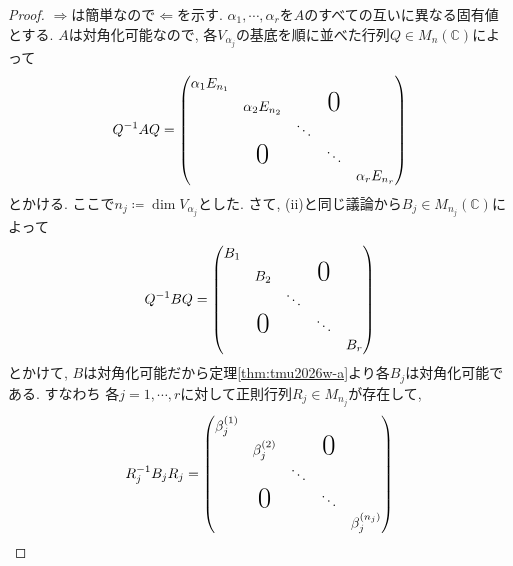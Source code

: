 \documentclass[titlepage]{jsarticle}
\numberwithin{equation}{section}
\newcommand{\C}{\mathbb{C}}%
\begin{document}
\begin{proof}
$\Rightarrow$は簡単なので$\Leftarrow$を示す. $\alpha_1, \cdots, \alpha_r$を$A$のすべての互いに異なる固有値とする. $A$は対角化可能なので, 各$V_{\alpha_j}$の基底を順に並べた行列$Q \in M_n(\C)$によって
\begin{align}
Q^{-1}AQ = 
\begin{pmatrix}
\alpha_1E_{n_1}                                                           \\
         & \alpha_2E_{n_2}           &        & \text{\huge{0}}   \\
         &                      & \ddots                       \\
         & \text{\huge{0}} &        & \ddots             \\
         &                      &        &           & \alpha_rE_{n_r}
\end{pmatrix} \label{r2026-c}
\end{align}
とかける. ここで$n_j \coloneq \dim V_{\alpha_j}$とした. さて, (ii)と同じ議論から$B_j \in M_{n_j}(\C)$によって
\begin{align}
Q^{-1}BQ =
\begin{pmatrix}
B_ 1                                                           \\
         & B_2           &        & \text{\huge{0}}   \\
         &                      & \ddots                       \\
         & \text{\huge{0}} &        & \ddots             \\
         &                      &        &           & B_r
\end{pmatrix} \label{r2026-d}
\end{align}
とかけて, $B$は対角化可能だから定理\ref{thm:tmu2026w-a}より各$B_{j}$は対角化可能である. すなわち 各$j = 1, \cdots, r$に対して正則行列$R_j \in M_{n_j}$が存在して, 
\begin{align}
R_j^{-1}B_jR_j = 
\begin{pmatrix}
\beta_j^{(1)}                                                           \\
         & \beta_j^{(2)}           &        & \text{\huge{0}}   \\
         &                      & \ddots                       \\
         & \text{\huge{0}} &        & \ddots             \\
         &                      &        &           & \beta_j^{(n_j)}

\end{pmatrix}
\end{align}
\end{proof}
\end{document}
